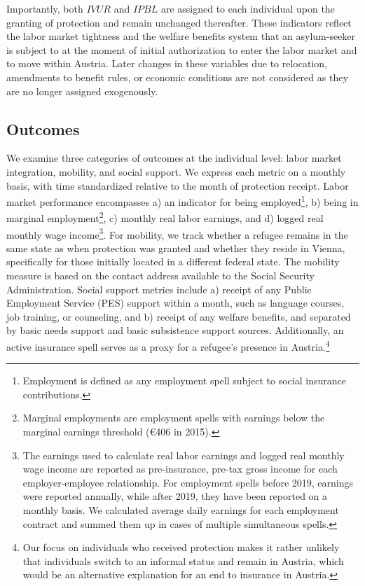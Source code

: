 Importantly, both $IVUR$ and $IPBL$ are assigned to each individual upon the granting of protection and remain unchanged thereafter. These indicators reflect the labor market tightness and the welfare benefits system that an asylum-seeker is subject to at the moment of initial authorization to enter the labor market and to move within Austria. Later changes in these variables due to relocation, amendments to benefit rules, or economic conditions are not considered as they are no longer assigned exogenously.

\subsection{Outcomes}

We examine three categories of outcomes at the individual level: labor market integration, mobility, and social support. %
We express each metric on a monthly basis, with time standardized relative to the month of protection receipt. Labor market performance encompasses a) an indicator for being employed\footnote{Employment is defined as any employment spell subject to social insurance contributions.}, b) being in marginal employment\footnote{Marginal employments are employment spells with earnings below the marginal earnings threshold (€406 in 2015).}, c) monthly real labor earnings, and d) logged real monthly wage income\footnote{The earnings used to calculate real labor earnings and logged real monthly wage income are reported as pre-insurance, pre-tax gross income for each employer-employee relationship. For employment spells before 2019, earnings were reported annually, while after 2019, they have been reported on a monthly basis. We calculated average daily earnings for each employment contract and summed them up in cases of multiple simultaneous spells.}. For mobility, we track whether a refugee remains in the same state as when protection was granted and whether they reside in Vienna, specifically for those initially located in a different federal state. The mobility measure is based on the contact address available to the Social Security Administration. 
Social support metrics include a) receipt of any Public Employment Service (PES) support within a month, such as language courses, job training, or counseling, and b) receipt of any welfare benefits, and separated by basic needs support and basic subsistence support sources. Additionally, an active insurance spell serves as a proxy for a refugee's presence in Austria.\footnote{Our focus on individuals who received protection makes it rather unlikely that individuals switch to an informal status and remain in Austria, which would be an alternative explanation for an end to insurance in Austria.}

